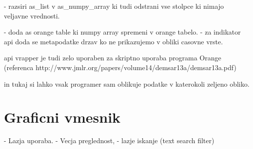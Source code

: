 - razsiri as\_list v as\_numpy\_array ki tudi odstrani vse stolpce ki nimajo 
  veljavne vrednosti.

- doda as orange table ki numpy array spremeni v orange tabelo.
  - za indikator api doda se metapodatke drzav ko ne prikazujemo v obliki casovne vrste.


api vrapper je tudi zelo uporaben za skriptno uporaba programa Orange 
(referenca http://www.jmlr.org/papers/volume14/demsar13a/demsar13a.pdf)

in tukaj si lahko vsak programer sam oblikuje podatke v katerokoli zeljeno obliko.






\section{Graficni vmesnik}


- Lazja uporaba.
- Vecja preglednost,
- lazje iskanje (text search filter)
